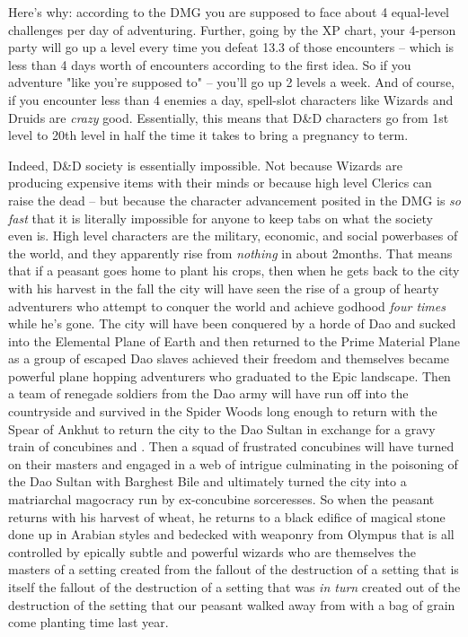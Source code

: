 Here's why: according to the DMG you are supposed to face about 4 equal-level challenges per day of adventuring. Further, going by the XP chart, your 4-person party will go up a level every time you defeat 13.3 of those encounters -- which is less than 4 days worth of encounters according to the first idea. So if you adventure "like you're supposed to" -- you'll go up 2 levels a week. And of course, if you encounter less than 4 enemies a day, spell-slot characters like Wizards and Druids are \textit{crazy} good. Essentially, this means that D\&D characters go from 1st level to 20th level in half the time it takes to bring a pregnancy to term.

Indeed, D\&D society is essentially impossible. Not because Wizards are producing expensive items with their minds or because high level Clerics can raise the dead -- but because the character advancement posited in the DMG is \textit{so fast} that it is literally impossible for anyone to keep tabs on what the society even is. High level characters are the military, economic, and social powerbases of the world, and they apparently rise from \textit{nothing} in about 2\half months. That means that if a peasant goes home to plant his crops, then when he gets back to the city with his harvest in the fall the city will have seen the rise of a group of hearty adventurers who attempt to conquer the world and achieve godhood \textit{four times} while he's gone. The city will have been conquered by a horde of Dao and sucked into the Elemental Plane of Earth and then returned to the Prime Material Plane as a group of escaped Dao slaves achieved their freedom and themselves became powerful plane hopping adventurers who graduated to the Epic landscape. Then a team of renegade soldiers from the Dao army will have run off into the countryside and survived in the Spider Woods long enough to return with the Spear of Ankhut to return the city to the Dao Sultan in exchange for a gravy train of concubines and . Then a squad of frustrated concubines will have turned on their masters and engaged in a web of intrigue culminating in the poisoning of the Dao Sultan with Barghest Bile and ultimately turned the city into a matriarchal magocracy run by ex-concubine sorceresses. So when the peasant returns with his harvest of wheat, he returns to a black edifice of magical stone done up in Arabian styles and bedecked with weaponry from Olympus that is all controlled by epically subtle and powerful wizards who are themselves the masters of a setting created from the fallout of the destruction of a setting that is itself the fallout of the destruction of a setting that was \textit{in turn} created out of the destruction of the setting that our peasant walked away from with a bag of grain come planting time last year.


